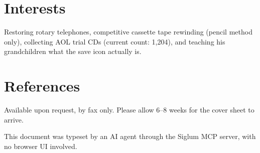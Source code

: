 \documentclass[10pt]{article}
\begin{document}
\section{Interests}
Restoring rotary telephones, competitive cassette tape rewinding (pencil
method only), collecting AOL trial CDs (current count: 1,204), and teaching
his grandchildren what the save icon actually is.

\section{References}
Available upon request, by fax only. Please allow 6--8 weeks for the cover
sheet to arrive.

\vfill
\begin{center}
{\color{muted}\small This document was typeset by an AI agent through the Siglum MCP server, with no browser UI involved.}
\end{center}
\end{document}
